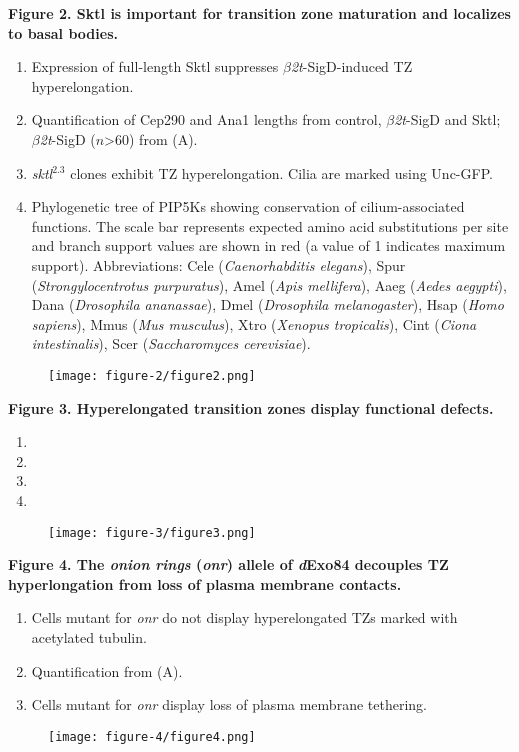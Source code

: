 \documentclass[12pt, twoside, letterpaper]{article}
\newcommand{\sigd}{$\beta$\textit{2t}-SigD}
\begin{document}
%
\textbf{Figure 2. Sktl is important for transition zone maturation and localizes to basal bodies.}
\begin{enumerate}[label={(\Alph*)}, nolistsep]
\item Expression of full-length Sktl suppresses \sigd{}-induced TZ hyperelongation.
\item Quantification of Cep290 and Ana1 lengths from control, \sigd{} and Sktl; \sigd{} ($n$\textgreater 60) from (A).
\item \textit{sktl}$^{2.3}$ clones exhibit TZ hyperelongation. Cilia are marked using
  Unc-GFP.
\item Phylogenetic tree of PIP5Ks showing conservation of cilium-associated functions.
  The scale bar represents expected amino acid substitutions per site and branch support values are shown in red (a value of 1 indicates maximum support).
Abbreviations: Cele (\textit{Caenorhabditis elegans}), Spur (\textit{Strongylocentrotus purpuratus}), Amel (\textit{Apis mellifera}), Aaeg (\textit{Aedes aegypti}), Dana (\textit{Drosophila ananassae}), Dmel (\textit{Drosophila melanogaster}), Hsap (\textit{Homo sapiens}), Mmus (\textit{Mus musculus}), Xtro (\textit{Xenopus tropicalis}), Cint (\textit{Ciona intestinalis}), Scer (\textit{Saccharomyces cerevisiae}).
\end{enumerate}

\begin{figure}[ht]
  \texttt{[image: figure-2/figure2.png]}
\end{figure}
\newpage


%
\textbf{Figure 3. Hyperelongated transition zones display functional defects.}
\begin{enumerate}[label={(\Alph*)}, nolistsep]
\item
\item
\item
\item
\end{enumerate}

\begin{figure}[ht]
  \texttt{[image: figure-3/figure3.png]}
\end{figure}
\newpage


\textbf{Figure 4. The \textit{onion rings} (\textit{onr}) allele of \textit{d}Exo84 decouples TZ hyperlongation from loss of plasma membrane contacts.}
\begin{enumerate}[label={(\Alph*)}, nolistsep]
\item Cells mutant for \textit{onr} do not display hyperelongated TZs marked with acetylated tubulin.
\item Quantification from (A).
\item Cells mutant for \textit{onr} display loss of plasma membrane tethering.
\end{enumerate}

\begin{figure}[ht]
  \texttt{[image: figure-4/figure4.png]}
\end{figure}
\newpage
\end{document}
